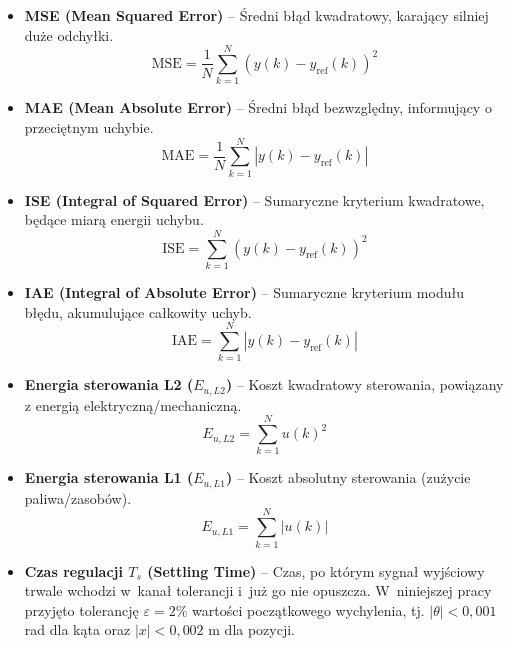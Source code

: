 \begin{itemize}
    \item \textbf{MSE (Mean Squared Error)} -- Średni błąd kwadratowy, karający silniej duże odchyłki.
    \begin{equation}
        \mathrm{MSE} = \frac{1}{N}\sum_{k=1}^{N} (y(k) - y_{\mathrm{ref}}(k))^2
    \end{equation}

    \item \textbf{MAE (Mean Absolute Error)} -- Średni błąd bezwzględny, informujący o przeciętnym uchybie.
    \begin{equation}
        \mathrm{MAE} = \frac{1}{N}\sum_{k=1}^{N} |y(k) - y_{\mathrm{ref}}(k)|
    \end{equation}

    \item \textbf{ISE (Integral of Squared Error)} -- Sumaryczne kryterium kwadratowe, będące miarą energii uchybu.
    \begin{equation}
        \mathrm{ISE} = \sum_{k=1}^{N} (y(k) - y_{\mathrm{ref}}(k))^2
    \end{equation}

    \item \textbf{IAE (Integral of Absolute Error)} -- Sumaryczne kryterium modułu błędu, akumulujące całkowity uchyb.
    \begin{equation}
        \mathrm{IAE} = \sum_{k=1}^{N} |y(k) - y_{\mathrm{ref}}(k)|
    \end{equation}

    \item \textbf{Energia sterowania L2 ($E_{u, L2}$)} -- Koszt kwadratowy sterowania, powiązany z energią elektryczną/mechaniczną.
    \begin{equation}
        E_{u, L2} = \sum_{k=1}^{N} u(k)^2
    \end{equation}

    \item \textbf{Energia sterowania L1 ($E_{u, L1}$)} -- Koszt absolutny sterowania (zużycie paliwa/zasobów).
    \begin{equation}
        E_{u, L1} = \sum_{k=1}^{N} |u(k)|
    \end{equation}

    \item \textbf{Czas regulacji $T_s$ (Settling Time)} -- Czas, po którym sygnał wyjściowy trwale wchodzi w~kanał tolerancji i~już go nie opuszcza. W~niniejszej pracy przyjęto tolerancję $\varepsilon = 2\%$ wartości początkowego wychylenia, tj. $|\theta| < 0{,}001$ rad dla kąta oraz $|x| < 0{,}002$ m dla pozycji.


\end{itemize}
